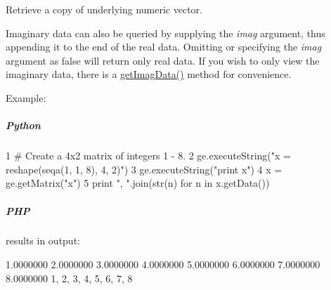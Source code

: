 Retrieve a copy of underlying numeric vector. 

Imaginary data can also be queried by supplying the {\itshape imag} argument, thus appending it to the end of the real data. Omitting or specifying the {\itshape imag} argument as {\ttfamily false} will return only real data. If you wish to only view the imaginary data, there is a \hyperlink{class_g_e_matrix_acdb28ea46f440a4b4f97e59b93d4950e}{get\-Imag\-Data()} method for convenience.

Example\-:

\subparagraph*{Python}


\begin{DoxyCode}
1 \textcolor{comment}{# Create a 4x2 matrix of integers 1 - 8.}
2 ge.executeString(\textcolor{stringliteral}{"x = reshape(seqa(1, 1, 8), 4, 2)"})
3 ge.executeString(\textcolor{stringliteral}{"print x"})
4 x = ge.getMatrix(\textcolor{stringliteral}{"x"})
5 \textcolor{keywordflow}{print} \textcolor{stringliteral}{", "}.join(str(n) \textcolor{keywordflow}{for} n \textcolor{keywordflow}{in} x.getData())
\end{DoxyCode}


\subparagraph*{P\-H\-P}


 results in output\-: 
\begin{DoxyCode}
       1.0000000        2.0000000
       3.0000000        4.0000000
       5.0000000        6.0000000
       7.0000000        8.0000000
1, 2, 3, 4, 5, 6, 7, 8
\end{DoxyCode}



